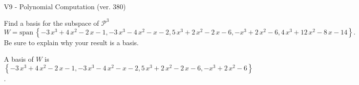 \begin{exercise}
  \begin{exerciseTitle}V9 - Polynomial Computation (ver. 380)\end{exerciseTitle}
  \begin{exerciseStatement}
    Find a basis for the subspace of \(\mathcal{P}^3\) 
\[W=\mathrm{span}\ \left\{-3 \, x^{3} + 4 \, x^{2} - 2 \, x - 1 , -3 \, x^{3} - 4 \, x^{2} - x - 2 , 5 \, x^{3} + 2 \, x^{2} - 2 \, x - 6 , -x^{3} + 2 \, x^{2} - 6 , 4 \, x^{3} + 12 \, x^{2} - 8 \, x - 14\right\}.\]
 Be sure to explain why your result is a basis.


  \end{exerciseStatement}
  \begin{exerciseAnswer}
   A basis of \(W\) is  \(\left\{-3 \, x^{3} + 4 \, x^{2} - 2 \, x - 1 , -3 \, x^{3} - 4 \, x^{2} - x - 2 , 5 \, x^{3} + 2 \, x^{2} - 2 \, x - 6 , -x^{3} + 2 \, x^{2} - 6\right\}\).
  


  \end{exerciseAnswer}
\end{exercise}